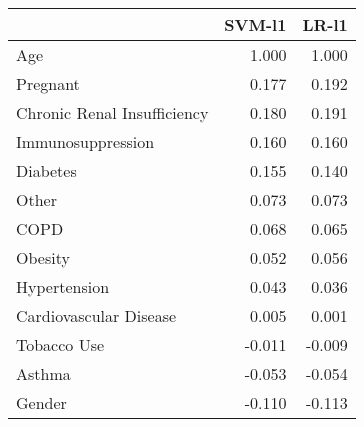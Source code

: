 \begin{tabular}{lrr}
\toprule
{} &  SVM-l1 &  LR-l1 \\
\midrule
Age                         &   1.000 &  1.000 \\
Pregnant                    &   0.177 &  0.192 \\
Chronic Renal Insufficiency &   0.180 &  0.191 \\
Immunosuppression           &   0.160 &  0.160 \\
Diabetes                    &   0.155 &  0.140 \\
Other                       &   0.073 &  0.073 \\
COPD                        &   0.068 &  0.065 \\
Obesity                     &   0.052 &  0.056 \\
Hypertension                &   0.043 &  0.036 \\
Cardiovascular Disease      &   0.005 &  0.001 \\
Tobacco Use                 &  -0.011 & -0.009 \\
Asthma                      &  -0.053 & -0.054 \\
Gender                      &  -0.110 & -0.113 \\
\bottomrule
\end{tabular}
